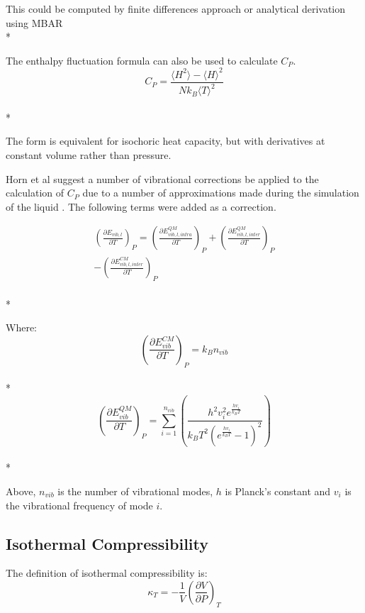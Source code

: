 \documentclass[aps,pre,twocolumn,nofootinbib,superscriptaddress,linenumbers,10pt, draft,tightenlines]{revtex4-1}
\begin{document}
This could be computed by finite differences approach or analytical derivation using MBAR\\*

The enthalpy fluctuation formula can also be used to calculate $C_P$\cite{horn}.
\begin{equation}C_P = \frac{\langle H^2 \rangle - \langle H \rangle^2}{N k_B \langle T \rangle^2}\end{equation}\\*

The form is equivalent for isochoric heat capacity, but with derivatives at constant volume rather than pressure.

Horn et al suggest a number of vibrational corrections be applied to the calculation of $C_P$ due to a number of approximations made during the simulation of the liquid \cite{horn}. The following terms were added as a correction.

\begin{multline}
\left(\frac{\partial E_{vib,l}}{\partial T}\right)_{P} = \left(\frac{\partial E_{vib,l,intra}^{QM}}{\partial T}\right)_{P} + \left(\frac{\partial E_{vib,l,inter}^{QM}}{\partial T}\right)_{P} \\ - \left(\frac{\partial E_{vib,l,inter}^{CM}}{\partial T}\right)_{P}
\end{multline}\\*

Where:
\begin{equation}\left(\frac{\partial E_{vib}^{CM}}{\partial T}\right)_{P} = k_B n_{vib}\end{equation}\\*
\begin{equation}\left(\frac{\partial E_{vib}^{QM}}{\partial T}\right)_{P} = \sum_{i=1}^{n_{vib}} \left(\frac{h^2 v_{i}^2 e^{\frac{h v_{i}}{k_B T}}}{k_B T^2 \left(e^{\frac{h v_{i}}{k_B T}} - 1\right)^2}\right)\end{equation}\\*

Above, $n_{vib}$ is the number of vibrational modes, $h$ is Planck's constant and $v_i$ is the vibrational frequency of mode $i$.

\subsection{Isothermal Compressibility}
The definition of isothermal compressibility is:
\begin{equation}\kappa_T = -\frac{1}{V} \left(\frac{\partial V}{\partial P}\right)_T \end{equation}
\end{document}
